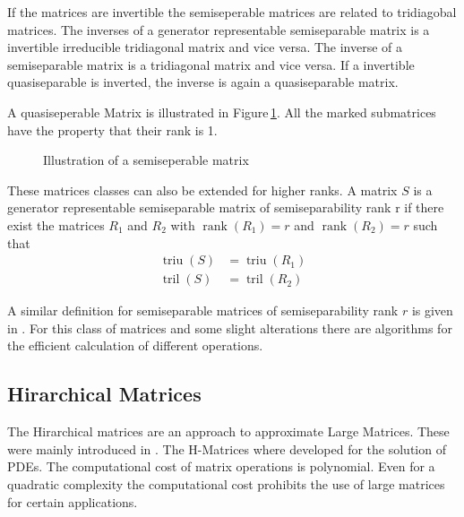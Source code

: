 \documentclass[doctype=mastersthesis,BCOR=15mm,biblatex]{ldvbook}%
\DeclareMathOperator{\rank}{rank}
\DeclareMathOperator{\triu}{triu}
\DeclareMathOperator{\tril}{tril}
\begin{document}
If the matrices are invertible the semiseperable matrices are related to tridiagobal matrices.
The inverses of a generator representable semiseparable matrix is a invertible irreducible tridiagonal matrix and vice versa. 
The inverse of a semiseparable matrix is a tridiagonal matrix and vice versa.
If a invertible quasiseparable is inverted, the inverse is again a quasiseparable matrix.

A quasiseperable Matrix is illustrated in Figure\,\ref{fig:quasiseperable}. All the marked submatrices have the property that their rank is 1.
\begin{figure}
	\centering
	
	\caption{Illustration of a semiseperable matrix}
	\label{fig:quasiseperable}
\end{figure}

These matrices classes can also be extended for higher ranks.
A matrix $S$ is a generator representable semiseparable matrix of semiseparability rank r if there exist the matrices $R_1$ and $R_2$ with $\rank(R_1)=r$ and $\rank(R_2)=r$ such that
\begin{align}
\triu(S) &= \triu(R_1)\\
\tril(S) &= \tril(R_2)
\end{align}

A similar definition for semiseparable matrices of semiseparability rank $r$ is given in \cite{vandebril_bibliography_2005}.
For this class of matrices and some slight alterations there are algorithms for the efficient calculation of different operations.

\subsection{Hirarchical Matrices}
The Hirarchical matrices are an approach to approximate Large Matrices. These were mainly introduced in \cite{grasedyck_theorie_2001,hackbusch_hierarchische_2009}.
The H-Matrices where developed for the solution of PDEs.
The computational cost of matrix operations is polynomial. Even for a quadratic complexity the computational cost prohibits the use of large matrices for certain applications.
\end{document}
